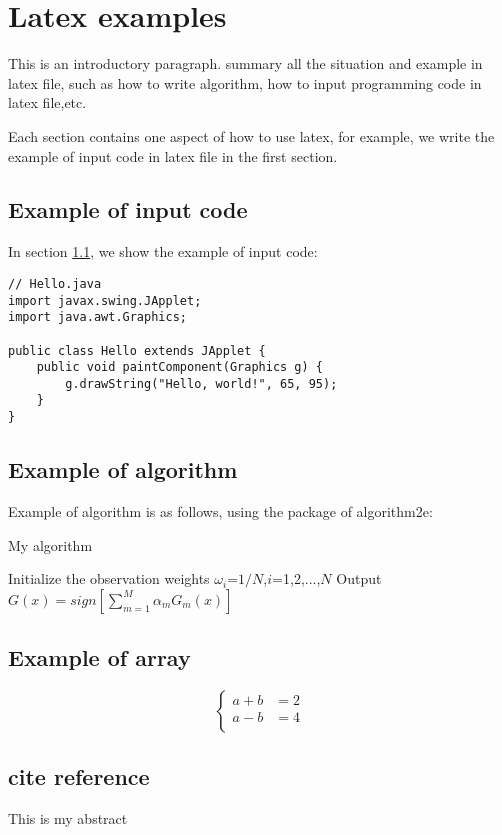 \chapter{Latex examples}

This is an introductory paragraph. summary all the situation and example in latex file, such as how to write algorithm, how to input programming code in latex file,etc.

Each section contains one aspect of how to use latex, for example, we write the example of input code in latex file in the first section.

\section{Example of input code}\label{sec:input_code}
In section \ref{sec:input_code}, we show the example of input code:

\begin{lstlisting}
// Hello.java
import javax.swing.JApplet;
import java.awt.Graphics;

public class Hello extends JApplet {
    public void paintComponent(Graphics g) {
        g.drawString("Hello, world!", 65, 95);
    }    
}
\end{lstlisting}


\section{Example of algorithm}
Example of algorithm is as follows, using the package of algorithm2e:\\

\begin{algorithm}[H]
\caption{My algorithm}\label{euclid}
		    \nl Initialize the observation weights $\omega_i$=$1/N$,$i$=1,2,...,$N$\;
		    \nl {}
		    \nl Output $G(x)=sign[\sum_{m=1}^{M}\alpha_m G_m(x)]$ \;
\end{algorithm}

\section{Example of array}
\begin{equation*}
\left\{
\begin{aligned}
a+b&=2\\
a-b&=4\\
\end{aligned}
\right.
\end{equation*}
\section{cite reference}

This is my abstract